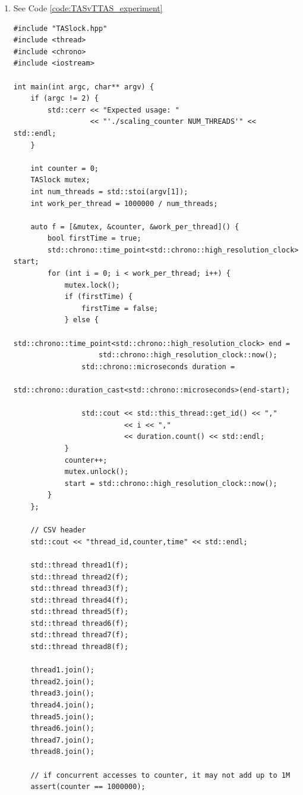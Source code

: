\begin{solution}
    \begin{enumerate}
        \item See Code \ref{code:TASvTTAS_experiment}
        
\makebox[\linewidth]{\rule{17cm}{0.4pt}}
{\centering \label{code:TASvTTAS_experiment}
\begin{verbatim}
#include "TASlock.hpp"
#include <thread>
#include <chrono>
#include <iostream>

int main(int argc, char** argv) {
    if (argc != 2) {
        std::cerr << "Expected usage: "
                  << "'./scaling_counter NUM_THREADS'" << std::endl;
    }

    int counter = 0;
    TASlock mutex;
    int num_threads = std::stoi(argv[1]);
    int work_per_thread = 1000000 / num_threads;

    auto f = [&mutex, &counter, &work_per_thread]() {
        bool firstTime = true;
        std::chrono::time_point<std::chrono::high_resolution_clock> start;
        for (int i = 0; i < work_per_thread; i++) {
            mutex.lock();
            if (firstTime) {
                firstTime = false;
            } else {
                std::chrono::time_point<std::chrono::high_resolution_clock> end =
                    std::chrono::high_resolution_clock::now();
                std::chrono::microseconds duration =
                    std::chrono::duration_cast<std::chrono::microseconds>(end-start);
                    
                std::cout << std::this_thread::get_id() << ","
                          << i << ","
                          << duration.count() << std::endl;
            }
            counter++;
            mutex.unlock();
            start = std::chrono::high_resolution_clock::now();
        }
    };

    // CSV header
    std::cout << "thread_id,counter,time" << std::endl;

    std::thread thread1(f);
    std::thread thread2(f);
    std::thread thread3(f);
    std::thread thread4(f);
    std::thread thread5(f);
    std::thread thread6(f);
    std::thread thread7(f);
    std::thread thread8(f);

    thread1.join();
    thread2.join();
    thread3.join();
    thread4.join();
    thread5.join();
    thread6.join();
    thread7.join();
    thread8.join();

    // if concurrent accesses to counter, it may not add up to 1M
    assert(counter == 1000000);


\end{verbatim}}
\end{enumerate}
\end{solution}
